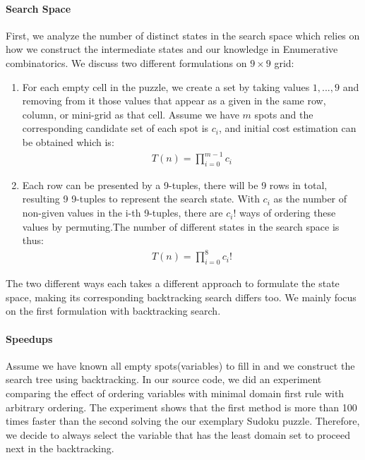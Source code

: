 \documentclass[../main.tex]{subfiles}
\begin{document}
\paragraph{Search Space}
First, we analyze the number of distinct states in the search space which relies on how we construct the intermediate states and  our knowledge in Enumerative combinatorics. We discuss two different formulations on $9 \times 9$ grid:
\begin{enumerate}
    \item For each empty cell in the puzzle, we create a set by taking values $1, ..., 9$ and removing from it those values that appear as a given in the same row, column, or mini-grid as that cell. Assume we have $m$ spots and the corresponding candidate set of each spot is $c_i$, and initial cost estimation can be obtained which is:
    \begin{align}
        T(n) = \prod_{i=0}^{m-1} c_i
    \end{align}
    \item Each row can be presented by a 9-tuples, there will be 9 rows in total, resulting 9 9-tuples to represent the search state. With $c_i$ as the number of non-given values in the i-th 9-tuples, there are $c_i!$ ways of ordering these values by permuting.The number of different states in the search space is thus:
    \begin{align}
        T(n) = \prod_{i=0}^{8} c_i!
    \end{align}
\end{enumerate}
The two different ways each takes a different approach to formulate the state space, making its corresponding backtracking search differs too. We mainly focus on the first formulation with backtracking search.
\paragraph{Speedups} 
Assume we have known all empty spots(variables) to fill in and we construct the search tree using backtracking. In our source code, we did an experiment comparing the effect of ordering variables with minimal domain first rule with arbitrary ordering. The experiment shows that the first method is more than 100 times faster than the second solving the our exemplary Sudoku puzzle. Therefore, we decide to always select the variable that has the least domain set to proceed next in the backtracking.
\end{document}

